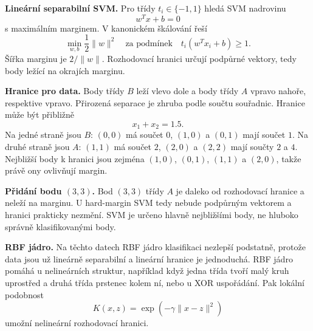 \begin{odpoved}
\textbf{Lineární separabilní SVM.} Pro třídy $t_i\in\{-1,1\}$ hledá SVM nadrovinu
\[
w^Tx+b=0
\]
s maximálním marginem. V kanonickém škálování řeší
\[
\min_{w,b}\frac12\|w\|^2
\quad\text{za podmínek}\quad
t_i(w^Tx_i+b)\ge1.
\]
Šířka marginu je $2/\|w\|$. Rozhodovací hranici určují podpůrné vektory, tedy body ležící
na okrajích marginu.

\textbf{Hranice pro data.} Body třídy $B$ leží vlevo dole a body třídy $A$ vpravo nahoře,
respektive vpravo. Přirozená separace je zhruba podle součtu souřadnic. Hranice může být
přibližně
\[
x_1+x_2=1.5.
\]
Na jedné straně jsou $B$: $(0,0)$ má součet $0$, $(1,0)$ a $(0,1)$ mají součet $1$.
Na druhé straně jsou $A$: $(1,1)$ má součet $2$, $(2,0)$ a $(2,2)$ mají součty $2$ a $4$.
Nejbližší body k hranici jsou zejména $(1,0)$, $(0,1)$, $(1,1)$ a $(2,0)$, takže právě ony
ovlivňují margin.

\textbf{Přidání bodu $(3,3)$.} Bod $(3,3)$ třídy $A$ je daleko od rozhodovací hranice a
neleží na marginu. U hard-margin SVM tedy nebude podpůrným vektorem a hranici prakticky
nezmění. SVM je určeno hlavně nejbližšími body, ne hluboko správně klasifikovanými body.

\textbf{RBF jádro.} Na těchto datech RBF jádro klasifikaci nezlepší podstatně, protože data
jsou už lineárně separabilní a lineární hranice je jednoduchá. RBF jádro pomáhá u nelineárních
struktur, například když jedna třída tvoří malý kruh uprostřed a druhá třída prstenec kolem
ní, nebo u XOR uspořádání. Pak lokální podobnost
\[
K(x,z)=\exp(-\gamma\|x-z\|^2)
\]
umožní nelineární rozhodovací hranici.
\end{odpoved}
